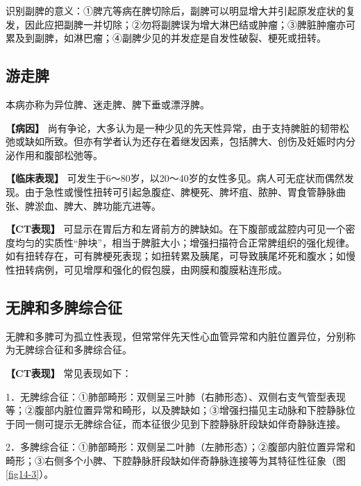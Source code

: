 识别副脾的意义：①脾亢等病在脾切除后，副脾可以明显增大并引起原发症状的复发，因此应把副脾一并切除；②勿将副脾误为增大淋巴结或肿瘤；③脾脏肿瘤亦可累及到副脾，如淋巴瘤；④副脾少见的并发症是自发性破裂、梗死或扭转。

\subsection{游走脾}

本病亦称为异位脾、迷走脾、脾下垂或漂浮脾。

\textbf{【病因】}
尚有争论，大多认为是一种少见的先天性异常，由于支持脾脏的韧带松弛或缺如所致。但亦有学者认为还存在着继发因素，包括脾大、创伤及妊娠时内分泌作用和腹部松弛等。

\textbf{【临床表现】}
可发生于6～80岁，以20～40岁的女性多见。病人可无症状而偶然发现。由于急性或慢性扭转可引起急腹症、脾梗死、脾坏疽、脓肿、胃食管静脉曲张、脾淤血、脾大、脾功能亢进等。

\textbf{【CT表现】}
可显示在胃后方和左肾前方的脾缺如。在下腹部或盆腔内可见一个密度均匀的实质性“肿块”，相当于脾脏大小；增强扫描符合正常脾组织的强化规律。如有扭转存在，可有脾梗死表现；如扭转累及胰尾，可导致胰尾坏死和腹水；如慢性扭转病例，可见增厚和强化的假包膜，由网膜和腹膜粘连形成。

\subsection{无脾和多脾综合征}

无脾和多脾可为孤立性表现，但常常伴先天性心血管异常和内脏位置异位，分别称为无脾综合征和多脾综合征。

\textbf{【CT表现】} 常见表现如下：

1．无脾综合征：①肺部畸形：双侧呈三叶肺（右肺形态）、双侧右支气管型表现等；②腹部内脏位置异常和畸形，以及脾缺如；③增强扫描见主动脉和下腔静脉位于同一侧可提示无脾综合征，而本征很少见到下腔静脉肝段缺如伴奇静脉连接。

2．多脾综合征：①肺部畸形：双侧呈二叶肺（左肺形态）；②腹部内脏位置异常和畸形；③右侧多个小脾、下腔静脉肝段缺如伴奇静脉连接等为其特征性征象（图\ref{fig14-3}）。

